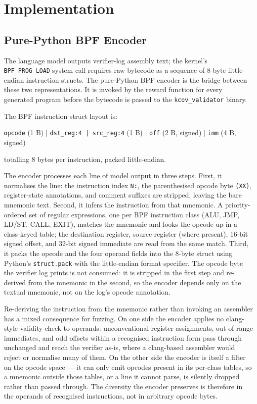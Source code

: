\chapter{Implementation}
\label{ch:implementation}

\section{Pure-Python BPF Encoder}
\label{sec:encoder}

The language model outputs verifier-log assembly text; the kernel's
\texttt{BPF\_PROG\_LOAD} system call requires raw bytecode as a sequence of
8-byte little-endian instruction structs.
The pure-Python BPF encoder is the bridge between these two representations.
It is invoked by the reward function for every generated program before the
bytecode is passed to the \texttt{kcov\_validator} binary.

The BPF instruction struct layout is:
\begin{center}
  \texttt{opcode} (1 B) $\mid$
  \texttt{dst\_reg:4 | src\_reg:4} (1 B) $\mid$
  \texttt{off} (2 B, signed) $\mid$
  \texttt{imm} (4 B, signed)
\end{center}
totalling 8 bytes per instruction, packed little-endian.

The encoder processes each line of model output in three steps.
First, it normalises the line: the instruction index \texttt{N:}, the parenthesised
opcode byte \texttt{(XX)}, register-state annotations, and comment suffixes are
stripped, leaving the bare mnemonic text.
Second, it infers the instruction from that mnemonic. A priority-ordered set of
regular expressions, one per BPF instruction class (ALU, JMP, LD/ST, CALL, EXIT),
matches the mnemonic and looks the opcode up in a class-keyed table; the
destination register, source register (where present), 16-bit signed offset, and
32-bit signed immediate are read from the same match.
Third, it packs the opcode and the four operand fields into the 8-byte struct
using Python's \texttt{struct.pack} with the little-endian format specifier.
The opcode byte the verifier log prints is not consumed: it is stripped in the first
step and re-derived from the mnemonic in the second, so the encoder depends only on
the textual mnemonic, not on the log's opcode annotation.

Re-deriving the instruction from the mnemonic rather than invoking an assembler has
a mixed consequence for fuzzing. On one side the encoder applies no clang-style
validity check to operands: unconventional register assignments, out-of-range
immediates, and odd offsets within a recognised instruction form pass through
unchanged and reach the verifier as-is, where a clang-based assembler would reject or
normalise many of them. On the other side the encoder is itself a filter on the
opcode space --- it can only emit opcodes present in its per-class tables, so a
mnemonic outside those tables, or a line it cannot parse, is silently dropped rather
than passed through. The diversity the encoder preserves is therefore in the operands
of recognised instructions, not in arbitrary opcode bytes.

